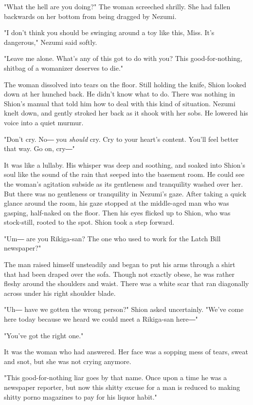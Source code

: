 "What the hell are you doing?" The woman screeched shrilly. She had
fallen backwards on her bottom from being dragged by Nezumi.

"I don't think you should be swinging around a toy like this, Miss. It's
dangerous," Nezumi said softly.

"Leave me alone. What's any of this got to do with you? This
good-for-nothing, shitbag of a womanizer deserves to die."

The woman dissolved into tears on the floor. Still holding the knife,
Shion looked down at her hunched back. He didn't know what to do. There
was nothing in Shion's manual that told him how to deal with this kind
of situation. Nezumi knelt down, and gently stroked her back as it shook
with her sobs. He lowered his voice into a quiet murmur.

"Don't cry. No― you \emph{should} cry. Cry to your heart's content. You'll feel
better that way. Go on, cry―"

It was like a lullaby. His whisper was deep and soothing, and soaked
into Shion's soul like the sound of the rain that seeped into the
basement room. He could see the woman's agitation subside as its
gentleness and tranquility washed over her. But there was no gentleness
or tranquility in Nezumi's gaze. After taking a quick glance around the
room, his gaze stopped at the middle-aged man who was gasping,
half-naked on the floor. Then his eyes flicked up to Shion, who was
stock-still, rooted to the spot. Shion took a step forward.

"Um― are you Rikiga-san? The one who used to work for the Latch Bill
newspaper?"

The man raised himself unsteadily and began to put his arms through a
shirt that had been draped over the sofa. Though not exactly obese, he
was rather fleshy around the shoulders and waist. There was a white scar
that ran diagonally across under his right shoulder blade.

"Uh― have we gotten the wrong person?" Shion asked uncertainly. "We've
come here today because we heard we could meet a Rikiga-san here―"

"You've got the right one."

It was the woman who had answered. Her face was a sopping mess of tears,
sweat and snot, but she was not crying anymore.

"This good-for-nothing liar goes by that name. Once upon a time he was a
newspaper reporter, but now this shitty excuse for a man is reduced to
making shitty porno magazines to pay for his liquor habit."


